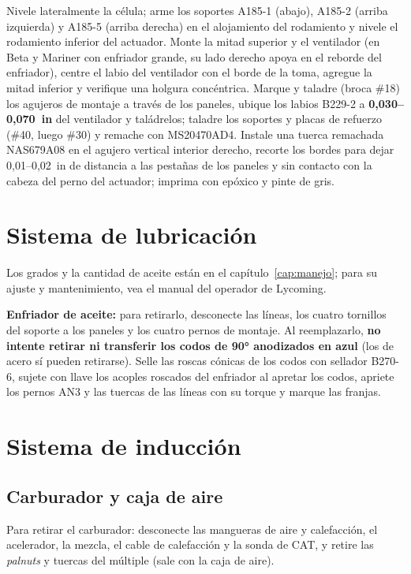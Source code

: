 Nivele lateralmente la célula; arme los soportes A185-1 (abajo), A185-2 (arriba izquierda) y A185-5 (arriba derecha) en el alojamiento del rodamiento y nivele el rodamiento inferior del actuador. Monte la mitad superior y el ventilador (en Beta y Mariner con enfriador grande, su lado derecho apoya en el reborde del enfriador), centre el labio del ventilador con el borde de la toma, agregue la mitad inferior y verifique una holgura concéntrica. Marque y taladre (broca \#18) los agujeros de montaje a través de los paneles, ubique los labios B229-2 a \textbf{0,030--0,070~in} del ventilador y taládrelos; taladre los soportes y placas de refuerzo (\#40, luego \#30) y remache con MS20470AD4. Instale una tuerca remachada NAS679A08 en el agujero vertical interior derecho, recorte los bordes para dejar 0,01--0,02~in de distancia a las pestañas de los paneles y sin contacto con la cabeza del perno del actuador; imprima con epóxico y pinte de gris.

\section{Sistema de lubricación}

Los grados y la cantidad de aceite están en el capítulo~\ref{cap:manejo}; para su ajuste y mantenimiento, vea el manual del operador de Lycoming.

\textbf{Enfriador de aceite:} para retirarlo, desconecte las líneas, los cuatro tornillos del soporte a los paneles y los cuatro pernos de montaje. Al reemplazarlo, \textbf{no intente retirar ni transferir los codos de 90° anodizados en azul} (los de acero sí pueden retirarse). Selle las roscas cónicas de los codos con sellador B270-6, sujete con llave los acoples roscados del enfriador al apretar los codos, apriete los pernos AN3 y las tuercas de las líneas con su torque y marque las franjas.

\section{Sistema de inducción}

\subsection{Carburador y caja de aire}

Para retirar el carburador: desconecte las mangueras de aire y calefacción, el acelerador, la mezcla, el cable de calefacción y la sonda de CAT, y retire las \emph{palnuts} y tuercas del múltiple (sale con la caja de aire).

